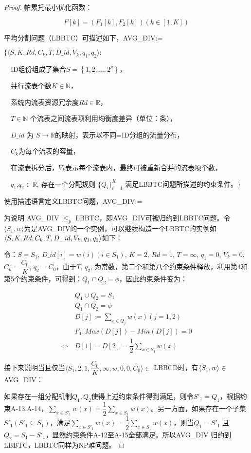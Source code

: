 \begin{proof}
	帕累托最小优化函数：
	
	\begin{equation} \label{a3}
	F\left[ k\right] =\left( F_{1}\left[ k\right] ,F_{2}\left[ k\right] \right) \left( k\in \left[ 1,K\right] \right)
	\end{equation}
	
	
	平均分割问题（LBBTC）可描述如下，AVG\_DIV:=
	
	\noindent $\{ \langle  S, K, Rd, C_k, T, D\_id, V_k, q_1, q_2\rangle:  $
	
	\ \ ID组份组成了集合$S=\left\{ 1,2,\ldots ,2^p\right\}$，
	
	\ \ 并行流表个数$K\in \mathbb{N}$，
	
	\ \ 系统内流表资源冗余度$Rd \in \mathbb{R}$，
	
	\ \ $T \in \mathbb{N}$ 个流表之间流表项利用均衡度差异（单位：条），
	
	\ \ $D\_id$ 为 $S \rightarrow \mathbb{R}$的映射，表示以不同=ID分组的流量分布，
	
	\ \ $C_k$为每个流表的容量，
	
	\ \ 在流表拆分后，$V_k$表示每个流表内，最终可被重新合并的流表项个数， 
	
	\ \ $q_1$,$q_2 \in \mathbb{R}$, 存在一个分配规则 $\{Q_i\}^{K}_{i=1}$ 满足LBBTC问题所描述的约束条件。$\}$
	
	使用描述语言定义LBBTC问题，AVG\_DIV:=
	
	为说明 AVG\_DIV $\leq_p$ LBBTC，即AVG\_DIV可被归约到LBBTC问题。令$\langle S_1, w \rangle$为是AVG\_DIV的一个实例，可以继续构造一个LBBTC的实例如 $\langle  S, K, Rd, C_k, T, D\_id,\\ V_k, 
	q_1, q_2\rangle$如下：
	
	令：$S = S_1$,
	$D\_id[i] = w(i) (i \in S_1)$,
	$K = 2$, 
	$Rd = 1$,
	$T = \infty$, 
	$q_1 = 0$,
	$V_k = 0$, $C_{k}=\dfrac {C_{0}}{K}$, $q_2 = C_0$，由于$T$, $q_2$, 为常数，第二个和第八个约束条件释放，利用第4和第5个约束条件，可得到：$Q_1 \cap Q_2=\phi$，因此约束条件变为：
	
	
	\begin{align}\label{a4}
	&Q_1 \cup Q_2=S_1  \\
	&Q_1 \cap Q_2=\phi  \\
	&D\left[ j\right] :=\sum _{x\in Q_{j}}w(x) \left( j=1,2\right)\\
	&F_1:Max(D[j])-Min(D[j])=0 \nonumber \\
	\Leftrightarrow \ &D[1]=D[2]=\dfrac{1}{2}\sum_{x\in S_1}w(x) 
	\end{align}
	
	接下来说明当且仅当$\langle S_1, 2, 1, \dfrac {C_0}{K}, \infty, w, 0, 0, C_0 \rangle \in $ LBBCD时，有$\langle S_1, w\rangle \\
	\in $ AVG\_DIV：
	
	如果存在一组分配机制${Q_1, Q_2}$使得上述约束条件得到满足，则令$S'_1=Q_1$，根据约束A-13,A-14，$\sum_{x\in S'_1}w(x)=\dfrac{1}{2}\sum _{x \in S_1}w(x)$。另一方面，如果存在一个子集$S'_1( S'_1 \subseteq S_1)$，满足$\sum_{x\in S'_1}w(x)=\dfrac{1}{2}\sum _{x \in S_1}w(x)$，则当$Q_1=S'_1$ 且 $Q_2=S_1-S'_1$，显然约束条件A-12至A-15全部满足。所以AVG\_DIV 归约到LBBTC，LBBTC同样为NP难问题。
\end{proof}
